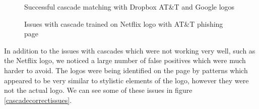 \documentclass[12pt,twoside]{report}
\begin{document}
\begin{figure}[!h]
\begin{center}
    \endminipage
\end{center}
\caption{Successful cascade matching with Dropbox AT\&T and Google logos}\label{fig:cascadematchingcomparison}
\end{figure}
\restoregeometry
\begin{figure}
    \centering
\caption{Issues with cascade trained on Netflix logo with AT\&T phishing page}\label{fig:cascadematchingnetflix}
\end{figure}
\noindent
In addition to the issues with cascades which were not working very well, such as the Netflix logo, we noticed a large number of false positives which were much harder to avoid. The logos were being identified on the page by patterns which appeared to be very similar to stylistic elements of the logo, however they were not the actual logo. We can see some of these issues in figure \ref{cascadecorrectissues}.
\end{document}
